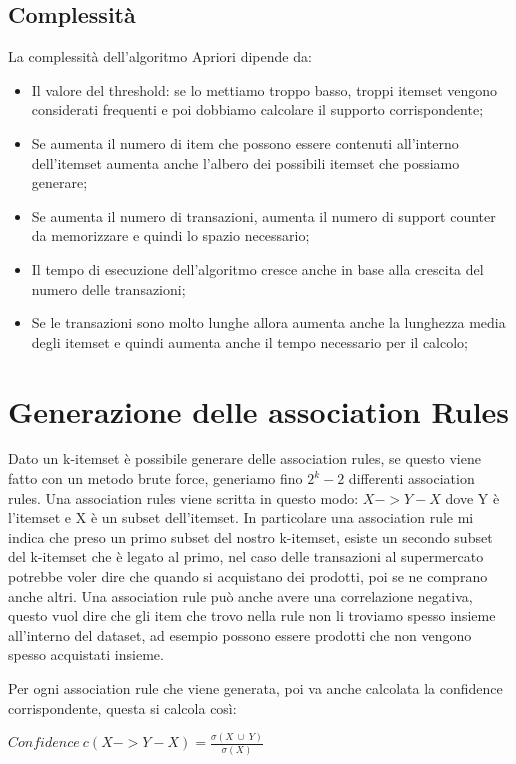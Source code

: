 \documentclass[14pt]{extreport}
\begin{document}
\subsection{Complessità}

La complessità dell'algoritmo Apriori dipende da:

\begin{itemize}
    \item Il valore del threshold: se lo mettiamo troppo basso, troppi itemset vengono considerati frequenti e poi dobbiamo calcolare il supporto corrispondente;
    \item Se aumenta il numero di item che possono essere contenuti all'interno dell'itemset aumenta anche l'albero dei possibili itemset che possiamo generare;
    \item Se aumenta il numero di transazioni, aumenta il numero di support counter da memorizzare e quindi lo spazio necessario;
    \item Il tempo di esecuzione dell'algoritmo cresce anche in base alla crescita del numero delle transazioni;
    \item Se le transazioni sono molto lunghe allora aumenta anche la lunghezza media degli itemset e quindi aumenta anche il tempo necessario per il calcolo;
\end{itemize}

\section{Generazione delle association Rules}

Dato un k-itemset è possibile generare delle association rules, se questo viene fatto con un metodo brute force, generiamo fino $2^k-2$ differenti association rules.
Una association rules viene scritta in questo modo: $X->Y-X$ dove Y è l'itemset e X è un subset dell'itemset. In particolare una association rule mi indica che preso un primo subset del nostro k-itemset, esiste un secondo subset del k-itemset che è legato al primo, nel caso delle transazioni al supermercato potrebbe voler dire che quando si acquistano dei prodotti, poi se ne comprano anche altri.
Una association rule può anche avere una correlazione negativa, questo vuol dire che gli item che trovo nella rule non li troviamo spesso insieme all'interno del dataset, ad esempio possono essere prodotti che non vengono spesso acquistati insieme.

Per ogni association rule che viene generata, poi va anche calcolata la confidence corrispondente, questa si calcola così:
\newline
\centerline{$Confidence \ c(X->Y-X) = \frac{\sigma{(X\ \cup \ Y)}}{\sigma{(X)}}$}
\end{document}
